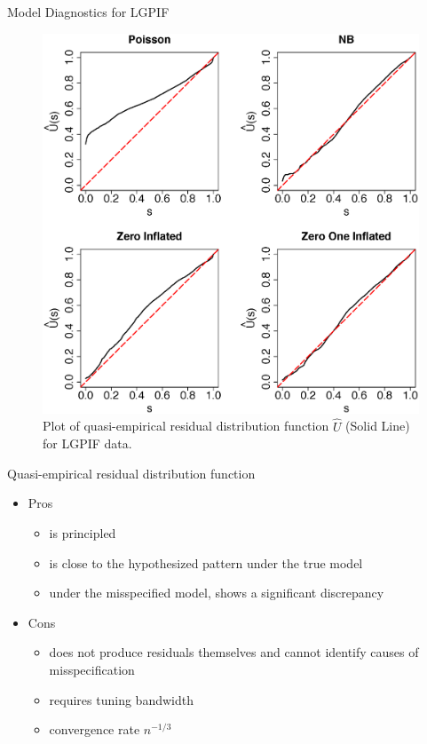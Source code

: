 \documentclass[
  ignorenonframetext,
]{beamer}
\providecommand{\tightlist}{%
  \setlength{\itemsep}{0pt}\setlength{\parskip}{0pt}}
\begin{document}
\begin{frame}{Model Diagnostics for LGPIF}
\protect\hypertarget{model-diagnostics-for-lgpif}{}
\begin{figure}
        \centering
            \includegraphics[width=.65\textwidth]{figures/marginplot}

        \caption{\small Plot of quasi-empirical residual distribution function $\hat{U}$ (Solid Line) for LGPIF data.}
\end{figure}
\end{frame}

\begin{frame}{Quasi-empirical residual distribution function}
\protect\hypertarget{quasi-empirical-residual-distribution-function-1}{}
\begin{itemize}
\tightlist
\item
  Pros

  \begin{itemize}
        \item is principled
            \item is close to the hypothesized pattern under the true model
            \item under the misspecified model, shows a significant discrepancy
        \end{itemize}
\item
  Cons

  \begin{itemize}
  \item does not produce residuals themselves and cannot identify causes of misspecification
  \item requires tuning bandwidth
  \item convergence rate $n^{-1/3}$
  \end{itemize}
\end{itemize}
\end{frame}
\end{document}
